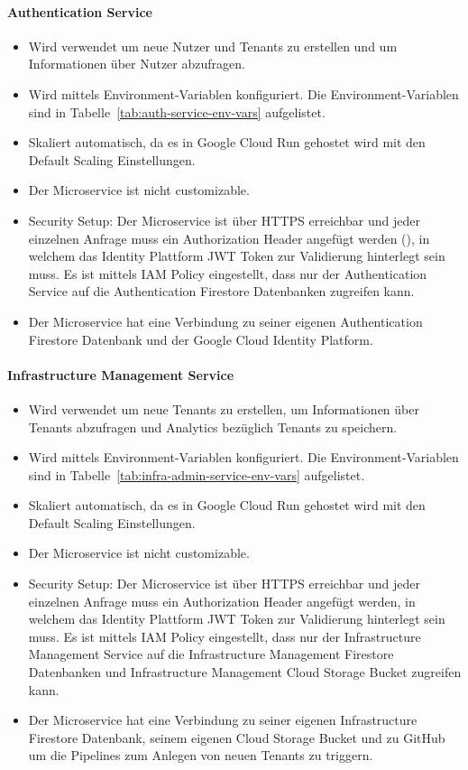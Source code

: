 \paragraph{Authentication Service}
\begin{itemize}
	\item Wird verwendet um neue Nutzer und Tenants zu erstellen und um Informationen über Nutzer abzufragen.
	\item Wird mittels Environment-Variablen konfiguriert. Die Environment-Variablen sind in Tabelle~\ref{tab:auth-service-env-vars} aufgelistet.
	\item Skaliert automatisch, da es in Google Cloud Run gehostet wird mit den Default Scaling Einstellungen.
	\item Der Microservice ist nicht customizable.
	\item Security Setup: Der Microservice ist über HTTPS erreichbar und jeder einzelnen Anfrage muss ein Authorization Header angefügt werden (), in welchem das Identity Plattform JWT Token zur Validierung hinterlegt sein muss. Es ist mittels IAM Policy eingestellt, dass nur der Authentication Service auf die Authentication Firestore Datenbanken zugreifen kann.
	\item Der Microservice hat eine Verbindung zu seiner eigenen Authentication Firestore Datenbank und der Google Cloud Identity Platform.
\end{itemize}

\paragraph{Infrastructure Management Service}
\begin{itemize}
	\item Wird verwendet um neue Tenants zu erstellen, um Informationen über Tenants abzufragen und Analytics bezüglich Tenants zu speichern.
	\item Wird mittels Environment-Variablen konfiguriert. Die Environment-Variablen sind in Tabelle~\ref{tab:infra-admin-service-env-vars} aufgelistet.
	\item Skaliert automatisch, da es in Google Cloud Run gehostet wird mit den Default Scaling Einstellungen.
	\item Der Microservice ist nicht customizable.
	\item Security Setup: Der Microservice ist über HTTPS erreichbar und jeder einzelnen Anfrage muss ein Authorization Header angefügt werden, in welchem das Identity Plattform JWT Token zur Validierung hinterlegt sein muss. Es ist mittels IAM Policy eingestellt, dass nur der Infrastructure Management Service auf die Infrastructure Management Firestore Datenbanken und Infrastructure Management Cloud Storage Bucket zugreifen kann.
	\item Der Microservice hat eine Verbindung zu seiner eigenen Infrastructure Firestore Datenbank, seinem eigenen Cloud Storage Bucket und zu GitHub um die Pipelines zum Anlegen von neuen Tenants zu triggern.
\end{itemize}

